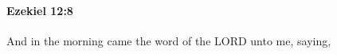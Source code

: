 
		\paragraph{Ezekiel 12:8} %
			\label{EZEKIEL-12-8}

			And in the morning came the word of the LORD unto me, saying,


